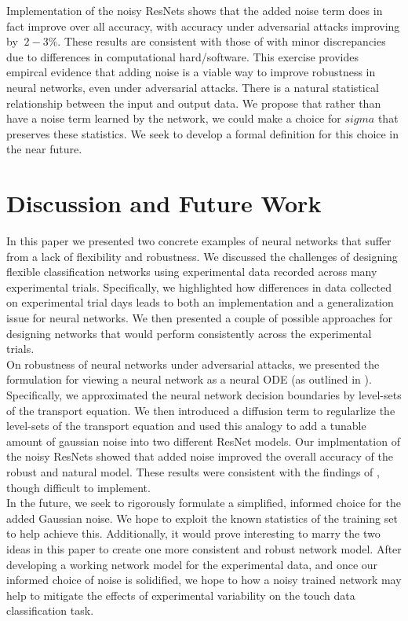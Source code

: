 \documentclass[12pt]{article}
\begin{document}
Implementation of the noisy ResNets shows that the added noise term does in fact improve over all accuracy, with accuracy under adversarial attacks improving by $~2-3\%$. These results are consistent with those of \cite{res} with minor discrepancies due to differences in computational hard/software. This exercise provides empircal evidence that adding noise is a viable way to improve robustness in neural networks, even under adversarial attacks. There is a natural statistical relationship between the input and output data. We propose that rather than have a noise term learned by the network, we could make a choice for $sigma$ that preserves these statistics. We seek to develop a formal definition for this choice in the near future. \\
\section{Discussion and Future Work}
In this paper we presented two concrete examples of neural networks that suffer from a lack of flexibility and robustness. We discussed the challenges of designing flexible classification networks using experimental data recorded across many experimental trials. Specifically, we highlighted how differences in data collected on experimental trial days leads to both an implementation and a generalization issue for neural networks.  We then presented a couple of possible approaches for designing networks that would perform consistently across the experimental trials.  \\
\indent On robustness of neural networks under adversarial attacks, we presented the formulation for viewing a neural network as a neural ODE (as outlined in \cite{node,res}). Specifically, we approximated the neural network decision boundaries by level-sets of the transport equation. We then introduced a diffusion term to regularlize the level-sets of the transport equation and used this analogy to add a tunable amount of gaussian noise into two different ResNet models. Our implmentation of the noisy ResNets showed that added noise improved the overall accuracy of the robust and natural model. These results were consistent with the findings of \cite{res}, though difficult to implement. \\
In the future, we seek to rigorously formulate a simplified, informed choice for the added Gaussian noise. We hope to exploit the known statistics of the training set to help achieve this. Additionally, it would prove interesting to marry the two ideas in this paper to create one more consistent and robust network model. After developing a working network model for the experimental data, and once our informed choice of noise is solidified, we hope to how a noisy trained network may help to mitigate the effects of experimental variability on the touch data classification task.
\pagebreak
\printbibliography
\end{document}

